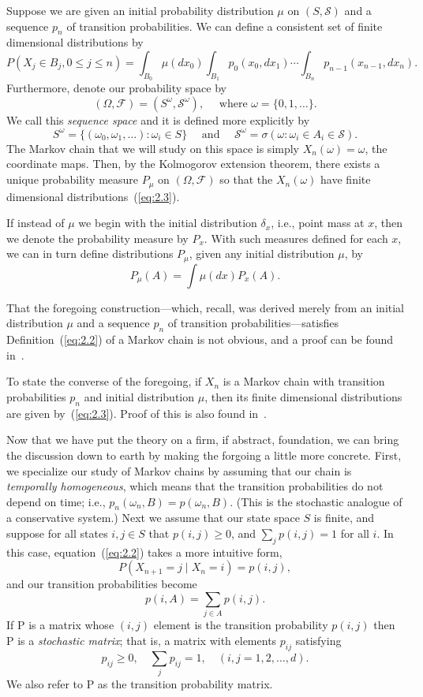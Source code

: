\documentclass[12pt,letterpaper]{report}
\theoremstyle{plain}
\theoremstyle{definition}
\theoremstyle{remark}
\numberwithin{theorem}{chapter}
\numberwithin{claim}{chapter}
\numberwithin{equation}{chapter}
\numberwithin{conjecture}{chapter}
\renewcommand\S{\ensuremath{\mathcal{S}}}
\newcommand\F{\ensuremath{\mathcal{F}}}
\renewcommand\P{\ensuremath{\mathrm{P}}}
\newcommand\pij{\ensuremath{p_{ij}}}
\newcommand\<{\ensuremath{\langle}}
\renewcommand\>{\ensuremath{\rangle}}
\begin{document}
Suppose we are given an initial probability distribution $\mu$ on $(S, \S)$ and a sequence $p_n$ of
transition probabilities. We can define a consistent set of finite dimensional distributions by
\begin{equation}
\label{eq:2.3}
P(X_j\in B_j ,0 \leq j \leq n) = \int_{B_0} \mu(dx_0) \int_{B_1} p_0(x_0, dx_1) 
\cdots 
\int_{B_n} p_{n-1}(x_{n-1}, dx_n).
\end{equation}
Furthermore, denote our probability space by
\[
(\Omega, \F) = (S^\omega,\S^\omega), \quad \text{ where } \omega = \{0,1,\dots\}.
\]
We call this \emph{sequence space} and it is defined more explicitly by
\[
S^\omega  = \{(\omega_0, \omega_1, \dots) : \omega_i \in S\}\quad \text{ and }
\quad
\S^\omega  = \sigma(\omega : \omega_i \in A_i \in \S).
\]
The Markov chain that we will study on this space is simply $X_n(\omega) = \omega$, the coordinate maps.
Then, by the Kolmogorov extension theorem, there exists a unique probability measure $P_\mu$ on
$(\Omega, \F)$ so that the $X_n(\omega)$ have finite dimensional distributions~(\ref{eq:2.3}).

If instead of $\mu$ we begin with the initial distribution $\delta_x$, i.e., point mass at $x$, then we
denote the probability measure by $P_x$. With such measures defined for each $x$, we can in turn
define distributions $P_\mu$, given any initial distribution $\mu$, by
\[
P_\mu(A) = \int \mu(dx)P_x(A).
\]

That the foregoing construction---which, recall, was derived merely from an
initial distribution $\mu$ and a sequence $p_n$ of transition
probabilities---satisfies Definition~(\ref{eq:2.2}) of a Markov chain is not
obvious, and a proof can be found in~\cite{Durret:1996}.

To state the converse of the foregoing, if $X_n$ is a Markov chain with
transition probabilities $p_n$ and initial distribution $\mu$, then its finite
dimensional distributions are given by~(\ref{eq:2.3}). Proof of this is also found
in~\cite{Durret:1996}. 

Now that we have put the theory on a firm, if abstract, foundation, we can bring
the discussion down to earth by making the forgoing a little more
concrete. First, we specialize our study of Markov chains by assuming that our
chain is \emph{temporally homogeneous}, which means that the transition
probabilities do not depend on time; i.e., 
$p_n(\omega_n, B) = p(\omega_n, B)$. (This is the stochastic analogue of a
conservative system.) 
Next we assume that our state space $S$ is finite, and suppose for all states
$i,j \in S$ that $p(i, j) \geq 0$, and $\sum_j p(i, j) = 1$ for all $i$. In
this case, equation~(\ref{eq:2.2}) takes a more intuitive form,
\[
P(X_{n+1}=j \mid X_n = i) =p(i,j),
\]
and our transition probabilities become
\[
p(i,A) = \sum_{j\in A} p(i,j).
\]
If $\P$ is a matrix whose $(i, j)$ element is the transition probability 
$p(i, j)$ then P is a \emph{stochastic matrix}; that is, a matrix with elements
$p_{ij}$ satisfying 
\[
\pij \geq 0, \quad \sum_j \pij =1, \quad (i, j =1, 2, \dots, d).
\]
We also refer to $\P$ as the transition probability matrix.
\end{document}
